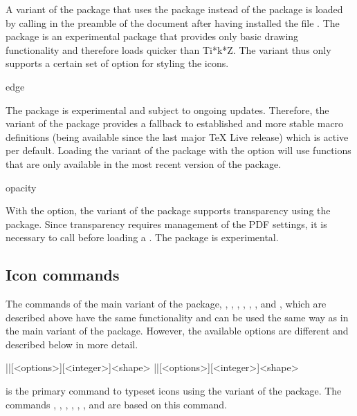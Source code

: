 \documentclass[a4paper]{article}
\begin{document}
A variant of the package that uses the  package instead of the  package is loaded by calling \macro{\usepackage{dndicons-l3draw}} in the preamble of the document after having installed the file . The  package is an experimental package that provides only basic drawing functionality and therefore loads quicker than Ti*k*Z. The  variant thus only supports a certain set of option for styling the icons. 

\begin{macrodef}edge\end{macrodef}
The  package is experimental and subject to ongoing updates. Therefore, the  variant of the  package provides a fallback to established and more stable macro definitions (being available since the last major TeX Live release) which is active per default. Loading the  variant of the package with the option  will use functions that are only available in the most recent version of the  package.

\begin{macrodef}opacity\end{macrodef}
With the  option, the  variant of the  package supports transparency using the  package. Since transparency requires management of the PDF settings, it is necessary to call \macro{\DocumentMetadata{}} before loading a \macro{\documentclass}. The  package is experimental.

\subsection{Icon commands}

The commands of the main variant of the  package, \macro{\die}, \macro{\ability}, \macro{\saving}, \macro{\spell}, \macro{\spellschool}, \macro{\damage}, \macro{\attack} and \macro{\condition}, which are described above have the same functionality and can be used the same way as in the main variant of the package. However, the available options are different and described below in more detail.

\begin{macrodef}
|\DndIconsUseIcon|[<options>][<integer>]{<shape>}
|\DndIconsUseIcon*|[<options>][<integer>]{<shape>}
\end{macrodef}
\macro{\DndIconsUseIcon} is the primary command to typeset icons using the  variant of the package. The commands \macro{\die}, \macro{\ability}, \macro{\saving}, \macro{\spell}, \macro{\spellschool}, \macro{\damage}, \macro{\attack} and \macro{\condition} are based on this command. 
\end{document}
